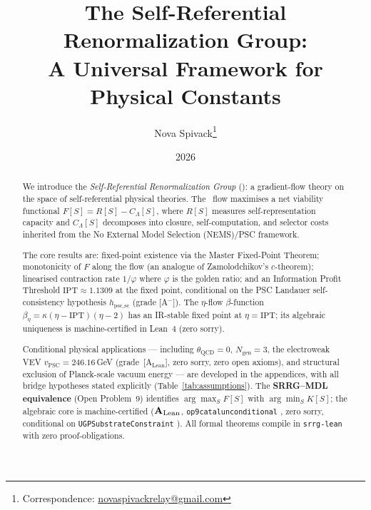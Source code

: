 \documentclass[11pt]{article}
\title{\bfseries The Self-Referential Renormalization Group: \\[0.3em]
A Universal Framework for Physical Constants}
\author[1]{Nova Spivack\thanks{Correspondence:
  \href{mailto:novaspivackrelay@gmail.com}{novaspivackrelay@gmail.com}}}
\affil[1]{Independent Research}
\date{2026}
\theoremstyle{remark}
\newcommand{\SRRG}{\text{SRRG}}
\newcommand{\CatAL}{\ensuremath{\textbf{A}_{\rm Lean}}}
\newcommand{\IPT}{\mathrm{IPT}}
\newcommand{\lean}[1]{%
  \penalty-100
  \begingroup
  \def\_{\textunderscore\allowbreak}%
  \texttt{#1}%
  \endgroup
}
\newcommand{\goldenratio}{\varphi}
\begin{document}
\maketitle
\NovaZenodoAfterTitle


\begin{abstract}
We introduce the \emph{Self-Referential Renormalization Group} (\SRRG): a
gradient-flow theory on the space of self-referential physical theories.
The \SRRG\ flow maximises a net viability functional $F[S] = R[S] - C_\Lambda[S]$,
where $R[S]$ measures self-representation capacity and $C_\Lambda[S]$ decomposes
into closure, self-computation, and selector costs inherited from the
No External Model Selection (NEMS)/PSC framework.

The core results are: fixed-point existence via the Master Fixed-Point Theorem;
monotonicity of $F$ along the flow (an analogue of Zamolodchikov's $c$-theorem);
linearised contraction rate $1/\goldenratio$ where $\goldenratio$ is the golden
ratio; and an Information Profit Threshold $\IPT\approx1.1309$ at the fixed
point, conditional on the PSC Landauer self-consistency hypothesis
$h_{\mathrm{psc\_sc}}$ (grade [A$^-$]).  The $\eta$-flow $\beta$-function
$\beta_\eta = \kappa(\eta-\IPT)(\eta-2)$ has an IR-stable fixed point at
$\eta=\IPT$; its algebraic uniqueness is machine-certified in Lean~4 (zero sorry).

Conditional physical applications --- including $\theta_{\mathrm{QCD}}=0$,
$N_{\mathrm{gen}}=3$, the electroweak VEV $v_{\mathrm{PSC}}=246.16$\,GeV
(grade~[A$_{\mathrm{Lean}}$], zero sorry, zero open axioms), and structural
exclusion of Planck-scale vacuum energy --- are developed in the appendices,
with all bridge hypotheses stated explicitly (Table~\ref{tab:assumptions}).
The \textbf{SRRG--MDL equivalence} (Open Problem~9) identifies
$\arg\max_S F[S]$ with $\arg\min_S K[S]$; the algebraic core is
machine-certified ($\CatAL$, \lean{op9\_catal\_unconditional}, zero sorry,
conditional on \lean{UGPSubstrateConstraint}).
All formal theorems compile in \texttt{srrg-lean} with zero proof-obligations.
\end{abstract}

\tableofcontents
\newpage

\end{document}
